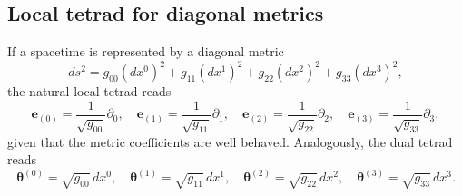 \documentclass[10pt,twoside,notitlepage,a4paper,fleqn,openbib]{report}
\begin{document}
\subsection{Local tetrad for diagonal metrics}\label{subsec:LTdiagMetrics}
If a spacetime is represented by a diagonal metric
\begin{equation}
  ds^2 = g_{00}(dx^0)^2 + g_{11}(dx^1)^2 + g_{22}(dx^2)^2 + g_{33}(dx^3)^2,
\end{equation}
the natural local tetrad reads
\begin{equation}
 \mathbf{e}_{(0)} = \frac{1}{\sqrt{g_{00}}}\partial_0,\quad \mathbf{e}_{(1)} = \frac{1}{\sqrt{g_{11}}}\partial_1,\quad \mathbf{e}_{(2)} = \frac{1}{\sqrt{g_{22}}}\partial_2,\quad \mathbf{e}_{(3)} = \frac{1}{\sqrt{g_{33}}}\partial_3,
\end{equation}
given that the metric coefficients are well behaved. Analogously, the dual tetrad reads
\begin{equation}
 \boldsymbol{\theta}^{(0)} = \sqrt{g_{00}}\,dx^0,\quad \boldsymbol{\theta}^{(1)} = \sqrt{g_{11}}\,dx^1,\quad \boldsymbol{\theta}^{(2)} = \sqrt{g_{22}}\,dx^2,\quad \boldsymbol{\theta}^{(3)} = \sqrt{g_{33}}\,dx^3.
\end{equation}


\end{document}
